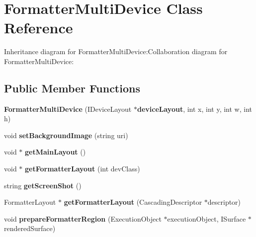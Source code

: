 \section{FormatterMultiDevice Class Reference}
\label{classbr_1_1pucrio_1_1telemidia_1_1ginga_1_1ncl_1_1multidevice_1_1FormatterMultiDevice}
Inheritance diagram for FormatterMultiDevice:Collaboration diagram for FormatterMultiDevice:\subsection*{Public Member Functions}
\begin{CompactItemize}
\item 
\textbf{FormatterMultiDevice} (IDeviceLayout $\ast${\bf deviceLayout}, int x, int y, int w, int h)\label{classbr_1_1pucrio_1_1telemidia_1_1ginga_1_1ncl_1_1multidevice_1_1FormatterMultiDevice_bbf15d86bc00a37bcddeb8c019ec5e99}

\item 
void \textbf{setBackgroundImage} (string uri)\label{classbr_1_1pucrio_1_1telemidia_1_1ginga_1_1ncl_1_1multidevice_1_1FormatterMultiDevice_795fc8fc43213cc9edc9b8fc6205643d}

\item 
void $\ast$ \textbf{getMainLayout} ()\label{classbr_1_1pucrio_1_1telemidia_1_1ginga_1_1ncl_1_1multidevice_1_1FormatterMultiDevice_460d3a42bd078d19e79294aab11c4faf}

\item 
void $\ast$ \textbf{getFormatterLayout} (int devClass)\label{classbr_1_1pucrio_1_1telemidia_1_1ginga_1_1ncl_1_1multidevice_1_1FormatterMultiDevice_2b22c5d3091c473f7035ce31f23aefb8}

\item 
string \textbf{getScreenShot} ()\label{classbr_1_1pucrio_1_1telemidia_1_1ginga_1_1ncl_1_1multidevice_1_1FormatterMultiDevice_c3bbd2029ed65635a16b2bd0c868c7f3}

\item 
FormatterLayout $\ast$ \textbf{getFormatterLayout} (CascadingDescriptor $\ast$descriptor)\label{classbr_1_1pucrio_1_1telemidia_1_1ginga_1_1ncl_1_1multidevice_1_1FormatterMultiDevice_6f82c59cdc5f61ce5ede0e43df99e29b}

\item 
void \textbf{prepareFormatterRegion} (ExecutionObject $\ast$executionObject, ISurface $\ast$renderedSurface)\label{classbr_1_1pucrio_1_1telemidia_1_1ginga_1_1ncl_1_1multidevice_1_1FormatterMultiDevice_b439144b5b13b4ea1c4efba5d790c22b}


\end{CompactItemize}
